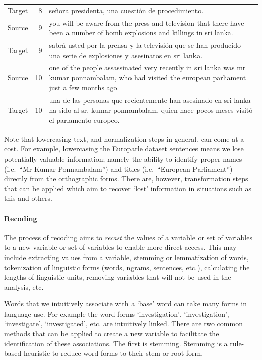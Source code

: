 \documentclass[
]{article}
\begin{document}
\begin{table}
\begin{tabular}[t]{lrl}
Target & 8 & señora presidenta, una cuestión de procedimiento.\\
Source & 9 & you will be aware from the press and television that there have been a number of bomb explosions and killings in sri lanka.\\
Target & 9 & sabrá usted por la prensa y la televisión que se han producido una serie de explosiones y asesinatos en sri lanka.\\
Source & 10 & one of the people assassinated very recently in sri lanka was mr kumar ponnambalam, who had visited the european parliament just a few months ago.\\
\addlinespace
Target & 10 & una de las personas que recientemente han asesinado en sri lanka ha sido al sr. kumar ponnambalam, quien hace pocos meses visitó el parlamento europeo.\\
\bottomrule
\end{tabular}
\end{table}

Note that lowercasing text, and normalization steps in general, can come at a cost. For example, lowercasing the Europarle dataset sentences means we lose potentially valuable information; namely the ability to identify proper names (i.e.~``Mr Kumar Ponnambalam'') and titles (i.e.~``European Parliament'') directly from the orthographic forms. There are, however, transformation steps that can be applied which aim to recover `lost' information in situations such as this and others.

\hypertarget{recoding}{%
\paragraph{Recoding}\label{recoding}}

The process of recoding aims to \emph{recast} the values of a variable or set of variables to a new variable or set of variables to enable more direct access. This may include extracting values from a variable, stemming or lemmatization of words, tokenization of linguistic forms (words, ngrams, sentences, etc.), calculating the lengths of linguistic units, removing variables that will not be used in the analysis, etc.

Words that we intuitively associate with a `base' word can take many forms in language use. For example the word forms `investigation', `investigation', `investigate', `investigated', etc. are intuitively linked. There are two common methods that can be applied to create a new variable to facilitate the identification of these associations. The first is stemming. Stemming is a rule-based heuristic to reduce word forms to their stem or root form.
\end{document}

